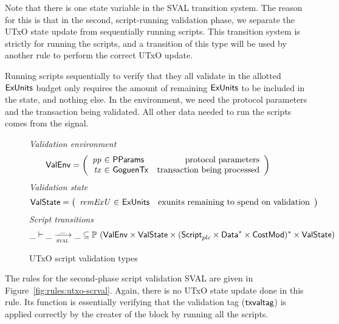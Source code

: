 Note that there is one state variable in the SVAL transition system. The reason
for this is that in the second, script-running validation phase, we separate
the UTxO state update from sequentially running scripts. This transition
system is strictly for running the scripts, and a transition of this type
will be used by another rule to perform the correct UTxO update.

Running scripts sequentially
to verify that they all validate in the allotted $\mathsf{ExUnits}$ budget only requires
the amount of remaining $\mathsf{ExUnits}$ to be included in the state, and nothing else.
In the environment, we need the protocol parameters and the
transaction being validated. All other data needed
to run the scripts comes from the signal.

\begin{figure}[htb]
  \emph{Validation environment}
  \begin{equation*}
    \ValEnv =
    \left(
      \begin{array}{r@{~\in~}lr}
        \var{pp} & \PParams & \text{protocol parameters}\\
        \var{tx} & \GoguenTx & \text{transaction being processed} \\
      \end{array}
    \right)
  \end{equation*}
  \emph{Validation state}
  \begin{equation*}
    \ValState =
    \left(
      \begin{array}{r@{~\in~}lr}
        \var{remExU} & \ExUnits & \text{exunits remaining to spend on validation} \\
      \end{array}
    \right)
  \end{equation*}
  \emph{Script transitions}
  \begin{equation*}
    \_ \vdash
    \var{\_} \trans{sval}{\_} \var{\_}
    \subseteq \powerset (\ValEnv \times \ValState \times \seqof{(\ScriptPlutus\times\seqof{\Data}\times\CostMod)} \times \ValState)
  \end{equation*}
  \caption{UTxO script validation types}
  \label{fig:ts-types:utxos}
\end{figure}

The rules for the second-phase script validation SVAL are given in
Figure~\ref{fig:rules:utxo-scrval}. Again, there is no UTxO state update
done in this rule. Its function is essentially verifying that the
validation tag ($\mathsf{txvaltag}$) is applied correctly by the creater of
the block by running all the scripts.


